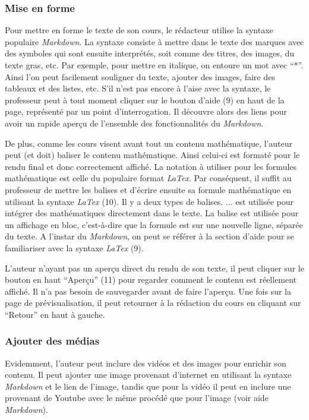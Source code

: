 \documentclass[a4paper,10pt,twoside]{sphinxmanual}
\begin{document}
\subsubsection{Mise en forme}
\label{functionalities:mise-en-forme}
Pour mettre en forme le texte de son cours, le rédacteur utilise la syntaxe populaire \emph{Markdown}. La syntaxe consiste à mettre dans le texte des marques avec des symboles qui sont ensuite interprétés, soit comme des titres, des images, du texte gras, etc. Par exemple, pour mettre en italique, on entoure un mot avec ``*''. Ainsi l'on peut facilement souligner du texte, ajouter des images, faire des tableaux et des listes, etc. S'il n'est pas encore à l'aise avec la syntaxe, le professeur peut à tout moment cliquer sur le bouton d'aide (9) en haut de la page, représenté par un point d'interrogation. Il découvre alors des liens pour avoir un rapide aperçu de l'ensemble des fonctionnalités du \emph{Markdown}.

De plus, comme les cours visent avant tout un contenu mathématique, l'auteur peut (et doit) baliser le contenu mathématique. Ainsi celui-ci est formaté pour le rendu final et donc correctement affiché. La notation à utiliser pour les formules mathématique est celle du populaire format \emph{LaTex}. Par conséquent, il suffit au professeur de mettre les balises et d'écrire ensuite sa formule mathématique en utilisant la syntaxe \emph{LaTex} (10). Il y a deux types de balises. \code{\textbackslash{}(} ... \code{\textbackslash{})} est utilisée pour intégrer des mathématiques directement dans le texte. La balise \code{\textbar{}\textbar{}} est utilisée pour un affichage en bloc, c'est-à-dire que la formule est sur une nouvelle ligne, séparée du texte. A l'instar du \emph{Markdown}, on peut se référer à la section d'aide pour se familiariser avec la syntaxe \emph{LaTex} (9).

L'auteur n'ayant pas un aperçu direct du rendu de son texte, il peut cliquer sur le bouton en haut ``Aperçu'' (11) pour regarder comment le contenu est réellement affiché. Il n'a pas besoin de sauvegarder avant de faire l'aperçu. Une fois sur la page de prévisualisation, il peut retourner à la rédaction du cours en cliquant sur ``Retour'' en haut à gauche.


\subsubsection{Ajouter des médias}
\label{functionalities:ajouter-des-medias}
Evidemment, l'auteur peut inclure des vidéos et des images pour enrichir son contenu. Il peut ajouter une image provenant d'internet en utilisant la syntaxe \emph{Markdown} et le lien de l'image, tandis que pour la vidéo il peut en inclure une provenant de Youtube avec le même procédé que pour l'image (voir aide \emph{Markdown}).
\end{document}
